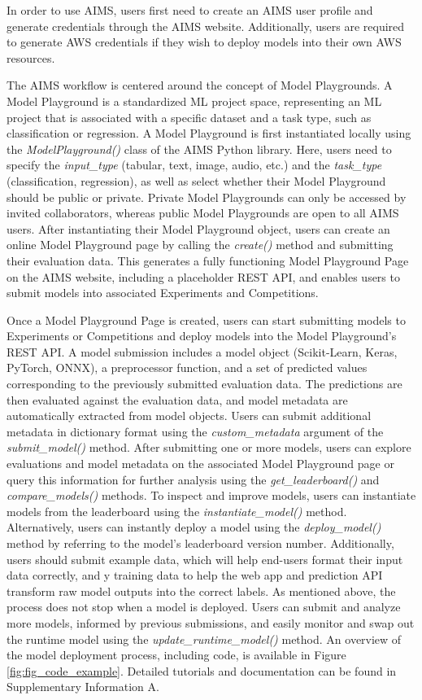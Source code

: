 In order to use AIMS, users first need to create an AIMS user profile and generate credentials through the AIMS website. Additionally, users are required to generate AWS credentials if they wish to deploy models into their own AWS resources. 

The AIMS workflow is centered around the concept of Model Playgrounds. A Model Playground is a standardized ML project space, representing an ML project that is associated with a specific dataset and a task type, such as classification or regression. A Model Playground is first instantiated locally using the \textit{ModelPlayground()} class of the AIMS Python library. Here, users need to specify the \textit{input\_type} (tabular, text, image, audio, etc.) and the \textit{task\_type} (classification, regression), as well as select whether their Model Playground should be public or private. Private Model Playgrounds can only be accessed by invited collaborators, whereas public Model Playgrounds are open to all AIMS users. After instantiating their Model Playground object, users can create an online Model Playground page by calling the \textit{create()} method and submitting their evaluation data. This generates a fully functioning Model Playground Page on the AIMS website, including a placeholder REST API, and enables users to submit models into associated Experiments and Competitions. 

Once a Model Playground Page is created, users can start submitting models to Experiments or Competitions and deploy models into the Model Playground’s REST API. A model submission includes a model object (Scikit-Learn, Keras, PyTorch, ONNX), a preprocessor function, and a set of predicted values corresponding to the previously submitted evaluation data. The predictions are then evaluated against the evaluation data, and model metadata are automatically extracted from model objects. Users can submit additional metadata in dictionary format using the \textit{custom\_metadata} argument of the \textit{submit\_model()} method. After submitting one or more models, users can explore evaluations and model metadata on the associated Model Playground page or query this information for further analysis using the \textit{get\_leaderboard()} and \textit{compare\_models()} methods. To inspect and improve models, users can instantiate models from the leaderboard using the \textit{instantiate\_model()} method. Alternatively, users can instantly deploy a model using the \textit{deploy\_model()} method by referring to the model’s leaderboard version number. Additionally, users should submit example data, which will help end-users format their input data correctly, and y training data to help the web app and prediction API transform raw model outputs into the correct labels. As mentioned above, the process does not stop when a model is deployed. Users can submit and analyze more models, informed by previous submissions, and easily monitor and swap out the runtime model using the \textit{update\_runtime\_model()} method. An overview of the model deployment process, including code, is available in Figure \ref{fig:fig_code_example}. Detailed tutorials and documentation can be found in Supplementary Information A.

